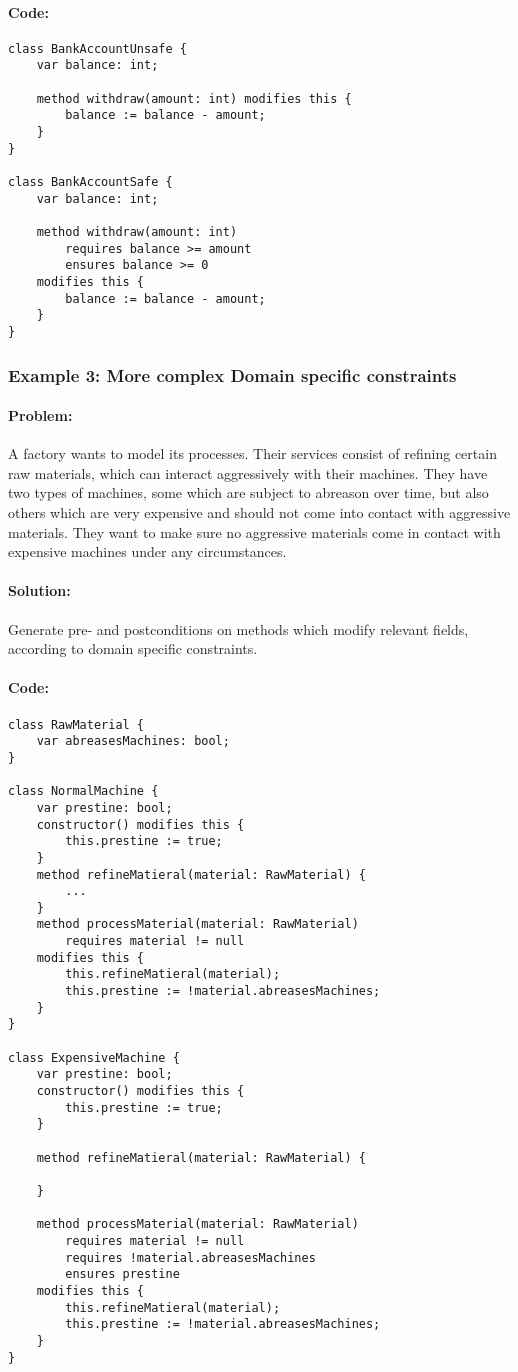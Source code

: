 \paragraph{Code:}
\begin{lstlisting}[language=dafny]
class BankAccountUnsafe {
	var balance: int;
	
	method withdraw(amount: int) modifies this {
		balance := balance - amount;
	}
}

class BankAccountSafe {
	var balance: int;
	
	method withdraw(amount: int) 
		requires balance >= amount  
		ensures balance >= 0  
	modifies this {
		balance := balance - amount;
	}
}
\end{lstlisting}
\subsubsection{Example 3: More complex Domain specific constraints} \label{Example 3}
\paragraph{Problem:}
A factory wants to model its processes. Their services consist of refining certain raw materials, which can interact aggressively with their machines. They have two types of machines, some which are subject to abreason over time, but also others which are very expensive and should not come into contact with aggressive materials. They want to make sure no aggressive materials come in contact with expensive machines under any circumstances.
\paragraph{Solution:}
Generate pre- and postconditions on methods which modify relevant fields, according to domain specific constraints.
\paragraph{Code:}
\begin{lstlisting}[language=dafny]
class RawMaterial {
	var abreasesMachines: bool;
}

class NormalMachine {
	var prestine: bool;
	constructor() modifies this {
		this.prestine := true;
	}
	method refineMatieral(material: RawMaterial) {
		...
	}
	method processMaterial(material: RawMaterial) 
		requires material != null
	modifies this {
		this.refineMatieral(material);
		this.prestine := !material.abreasesMachines;
	}
}

class ExpensiveMachine {
	var prestine: bool;
	constructor() modifies this {
		this.prestine := true;
	}
	
	method refineMatieral(material: RawMaterial) {
	
	}
	
	method processMaterial(material: RawMaterial) 
		requires material != null
		requires !material.abreasesMachines
		ensures prestine
	modifies this {
		this.refineMatieral(material);
		this.prestine := !material.abreasesMachines;
	}
}
\end{lstlisting}
